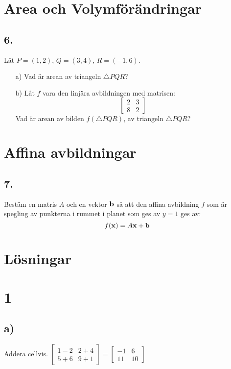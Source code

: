 \documentclass{article}
\begin{document}
\section*{Area och Volymförändringar}
\subsection*{6.}
Låt $P=(1,2)$, $Q=(3,4)$, $R=(-1,6)$.
\begin{itemize}
    \item[a) ] Vad är arean av triangeln $\bigtriangleup PQR$?
    \item[b) ] Låt $f$ vara den linjära avbildningen med matrisen: 
               $$\begin{bmatrix}
               2  & 3 \\
               8  & 2
               \end{bmatrix}$$
               Vad är arean av bilden $f(\bigtriangleup PQR)$, av triangeln 
               $\bigtriangleup PQR$?
\end{itemize}

\section*{Affina avbildningar}
\subsection*{7.}
Bestäm en matris $A$ och en vektor ${\bf b}$ så att den affina avbildning $f$ 
som är spegling av punkterna i rummet i planet som ges av $y=1$ ges av: 
$$f({\bf x})=A{\bf x}+{\bf b}$$


\section*{Lösningar}
\section*{1}
\subsection*{a)}
Addera cellvis.
$ 
    			\begin{bmatrix}
    			1-2 & 2+4 \\
    			5+6 & 9+1
    			\end{bmatrix}
    			=
    			\begin{bmatrix}
    			-1 & 6 \\
    			11  & 10
    			\end{bmatrix}
    			$
    			
\end{document}
